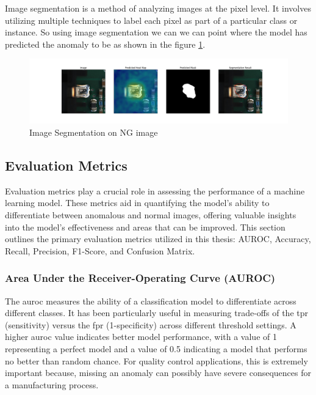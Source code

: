 Image segmentation is a method of analyzing images at the pixel level. It involves utilizing multiple techniques to label each pixel as part of a particular class or instance\cite{IBM2024}. So using image segmentation we can we can point where the model has predicted the anomaly to be as shown in the figure \ref{fig:Image Segmentation on NG image}.

\begin{figure}[ht!]
    \centering
    \includegraphics[width=1\linewidth]{Images/anomalous_image_segmentation.jpg}
    \caption{Image Segmentation on NG image}
    \label{fig:Image Segmentation on NG image}
\end{figure}

\subsection{Evaluation Metrics}
\label{subsec:Evaluation Metrics}

Evaluation metrics play a crucial role in assessing the performance of a machine learning model. These metrics aid in quantifying the model's ability to differentiate between anomalous and normal images, offering valuable insights into the model's effectiveness and areas that can be improved. This section outlines the primary evaluation metrics utilized in this thesis: AUROC, Accuracy, Recall, Precision, F1-Score, and Confusion Matrix.

\subsubsection*{Area Under the Receiver-Operating Curve (AUROC)}
\label{subsec:AUROC}

The \gls{auroc} measures the ability of a classification model to differentiate across different classes. It has been particularly useful in measuring trade-offs of the \gls{tpr} (sensitivity) versus the \gls{fpr} (1-specificity) across different threshold settings. A higher \gls{auroc} value indicates better model performance, with a value of 1 representing a perfect model and a value of 0.5 indicating a model that performs no better than random chance\cite{FAWCETT2006861}. For quality control applications, this is extremely important because, missing an anomaly can possibly have severe consequences for a manufacturing process. %

